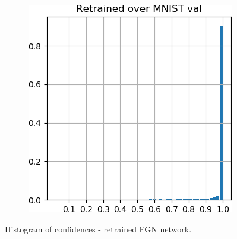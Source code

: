 \documentclass[12pt,oneside]{CUNY_PhD}
\begin{document}
\begin{figure}[!htbp]
    \centering
    \begin{subfigure}[t]{0.49\textwidth}
        \includegraphics[width=\textwidth]{images/mnist-behavior/retrained-hist-val.png}
    \end{subfigure}
    \caption{Histogram of confidences - retrained FGN network.}
    \label{fig:retrained-mnist}
\end{figure}
\end{document}
